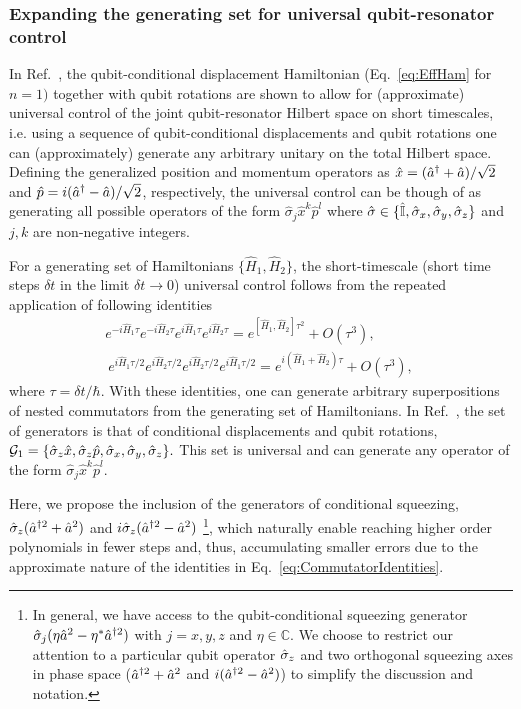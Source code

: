 {\subsubsection{Expanding the generating set for universal qubit-resonator control}}
{In Ref.~\cite{FastUnivControlDisp}, the qubit-conditional displacement Hamiltonian (Eq.~\eqref{eq:EffHam} for $n=1)$ together with qubit rotations are shown to allow for (approximate) universal control of the joint qubit-resonator Hilbert space on short timescales, i.e. using a sequence of qubit-conditional displacements and qubit rotations one can (approximately) generate any arbitrary unitary 
 on the total Hilbert space. Defining the generalized position and momentum operators as $\hat{x}=(\hat{a}^\dagger +\hat{a})/\sqrt{2}$ and $\hat{p}=i(\hat{a}^\dagger -\hat{a})/\sqrt{2}$, respectively, the universal control can be though of as generating all possible operators of the form $\hat{\sigma}_j \hat{x}^k \hat{p}^l$ where $\hat{\sigma}\in\{\hat{\mathbb{I}},\hat{\sigma}_x,\hat{\sigma}_y,\hat{\sigma}_z\}$ and $j,k$ are non-negative integers.} 
 
 {For a generating set of Hamiltonians $\{\hat{H}_1,\hat{H}_2\}$, the short-timescale (short time steps $\delta t$ in the limit $\delta t \rightarrow 0$) universal control follows from the repeated application of following identities \cite{FastUnivControlDisp,Park2017_RepeatedIdentities}}{\begin{subequations}\label{eq:CommutatorIdentities}\begin{align}
     e^{-i\hat{H}_1 \tau}e^{-i\hat{H}_2 \tau}e^{i\hat{H}_1 \tau}e^{i\hat{H}_2 \tau}=e^{[\hat{H}_1,\hat{H}_2]\tau^2} + O(\tau^3),\label{eq:CommutatorIdentitiesA}\\\
     e^{i\hat{H}_1 \tau/2}e^{i\hat{H}_2 \tau/2}e^{i\hat{H}_2 \tau/2}e^{i\hat{H}_1 \tau/2}=e^{i(\hat{H}_1 +\hat{H}_2)\tau} + O(\tau^3),\label{eq:CommutatorIdentitiesB}\
 \end{align}\end{subequations}}
 {where $\tau=\delta t / \hbar$. With these identities, one can generate arbitrary superpositions of nested commutators from the generating set of Hamiltonians. In Ref.~\cite{FastUnivControlDisp}, the set of generators is that of conditional displacements and qubit rotations, $\mathcal{G}_1=\{\hat{\sigma}_z \hat{x}, \hat{\sigma}_z \hat{p},\hat{\sigma}_x,\hat{\sigma}_y,\hat{\sigma}_z  \}.$ This set is universal and can generate any operator of the form $\hat{\sigma}_j \hat{x}^k \hat{p}^l$.}
 
 {Here, we propose the inclusion of the generators of conditional squeezing, $\hat{\sigma}_z(\hat{a}^{\dagger 2}+ \hat{a}^2)$ and $i\hat{\sigma}_z(\hat{a}^{\dagger 2} - \hat{a}^2)$ \footnote{In general, we have access to the qubit-conditional squeezing generator $\hat{\sigma}_j(\eta \hat{a}^2 - \eta^* \hat{a}^{\dagger 2} )$ with $j=x,y,z$ and $\eta\in \mathbb{C}$. We choose to restrict our attention to a particular qubit operator $\hat{\sigma}_z$ and two orthogonal squeezing axes in phase space ($\hat{a}^{\dagger 2} +\hat{a}^2$ and $i(\hat{a}^{\dagger 2} - \hat{a}^2)$) to simplify the discussion and notation.}, which naturally {enable reaching} higher order polynomials in fewer steps and, thus, accumulating smaller errors due to the approximate nature of the identities in Eq.~\eqref{eq:CommutatorIdentities}.}
 
